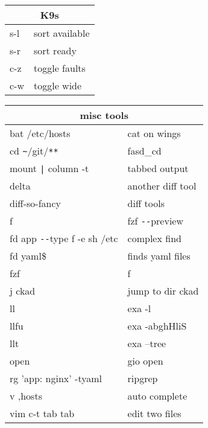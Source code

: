\documentclass[12pt,paper=landscape,paper=a4]{scrartcl}
\begin{document}
\begin{multicols}{3}
    \vspace{1em}

    \begin{tabular}{ll}
        \multicolumn{2}{c}{K9s}\\
        \hline
        s-l  & sort available\\
        s-r  & sort ready\\
        c-z  & toggle faults\\
        c-w  & toggle wide\\
    \end{tabular}

    \vspace{1em}

    \begin{tabular}{ll}
        \multicolumn{2}{c}{misc tools}\\
        \hline
        bat /etc/hosts              & cat on wings\\
        cd \verb!~!/git/\verb!**!   & fasd\_cd \\
        mount \verb!|! column -t    & tabbed output \\
        delta                       & another diff tool\\
        diff-so-fancy               & diff tools\\
        f                           & fzf \verb!--!preview\\
        fd app \verb!--!type f -e sh /etc & complex find \\
        fd yaml\$       & finds yaml files\\
        fzf             & f\\
        j ckad          & jump to dir ckad\\
        ll              & exa -l\\
        llfu            & exa -abghHliS\\
        llt             & exa --tree\\
        open            & gio open\\
        rg 'app: nginx' -tyaml      & ripgrep \\
        v ,hosts                    & auto complete\\
        vim c-t tab tab             & edit two files\\
    \end{tabular}

    \vspace{1em}


\end{multicols}
\end{document}

